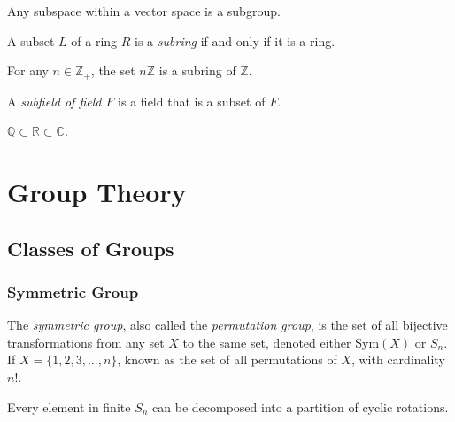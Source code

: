 \documentclass{article}
\begin{document}
    \begin{corollary}
      Any subspace within a vector space is a subgroup. 
    \end{corollary}

    \begin{definition}
      A subset $L$ of a ring $R$ is a \textit{subring} if and only if it is a ring. 
    \end{definition}

    \begin{example}
      For any $n \in \mathbb{Z}_{+}$, the set $n\mathbb{Z}$ is a subring of $\mathbb{Z}$. 
    \end{example}

    \begin{definition}
      A \textit{subfield of field $F$} is a field that is a subset of $F$.
    \end{definition}

    \begin{example}
      $\mathbb{Q} \subset \mathbb{R} \subset \mathbb{C}$. 
    \end{example}

\section{Group Theory}

  \subsection{Classes of Groups}

    \subsubsection{Symmetric Group}

      \begin{definition}
        The \textit{symmetric group}, also called the \textit{permutation group}, is the set of all bijective transformations from any set $X$ to the same set, denoted either Sym$(X)$ or $S_n$. If $X = \{1, 2, 3 ,... , n\}$, known as the set of all permutations of $X$, with cardinality $n!$. 
      \end{definition}

      \begin{proposition}
        Every element in finite $S_{n}$ can be decomposed into a partition of cyclic rotations.
      \end{proposition}
\end{document}

